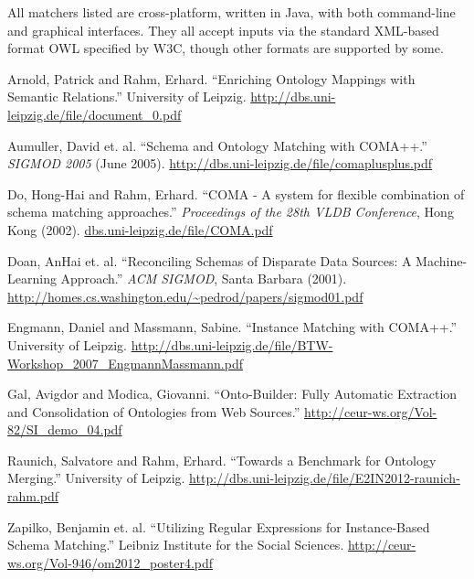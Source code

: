 \documentclass{article}
\theoremstyle{definition}
\theoremstyle{remark}
\begin{document}
All matchers listed are cross-platform, written in Java, with both command-line and graphical interfaces. They all accept inputs via the standard XML-based format OWL specified by W3C, though other formats are supported by some. 

\begin{thebibliography}{9}
	Arnold, Patrick and Rahm, Erhard.
	``Enriching Ontology Mappings with Semantic Relations.''
	University of Leipzig.
	\url{http://dbs.uni-leipzig.de/file/document_0.pdf}	

	Aumuller, David et. al.
	``Schema and Ontology Matching with COMA++.''
	\emph{SIGMOD 2005} (June 2005). 
	\url{http://dbs.uni-leipzig.de/file/comaplusplus.pdf}
	
	Do, Hong-Hai and Rahm, Erhard.
	``COMA - A system for flexible combination of schema matching approaches.''
	\emph{Proceedings of the 28th VLDB Conference}, Hong Kong (2002).
	\url{dbs.uni-leipzig.de/file/COMA.pdf}
	
	Doan, AnHai et. al.
	``Reconciling Schemas of Disparate Data Sources: A Machine-Learning Approach.''
	\emph{ACM SIGMOD}, Santa Barbara (2001).
	\url{http://homes.cs.washington.edu/~pedrod/papers/sigmod01.pdf}
	
	Engmann, Daniel and Massmann, Sabine.
	``Instance Matching with COMA++.''
	University of Leipzig.
	\url{ http://dbs.uni-leipzig.de/file/BTW-Workshop_2007_EngmannMassmann.pdf}
	
	Gal, Avigdor and Modica, Giovanni.
	``Onto-Builder: Fully Automatic Extraction and Consolidation of Ontologies from Web Sources.''
	\url{http://ceur-ws.org/Vol-82/SI_demo_04.pdf}

	Raunich, Salvatore and Rahm, Erhard.
	``Towards a Benchmark for Ontology Merging.''
	University of Leipzig.
	\url{http://dbs.uni-leipzig.de/file/E2IN2012-raunich-rahm.pdf}

	Zapilko, Benjamin et. al. 
	``Utilizing Regular Expressions for Instance-Based Schema Matching.''
	Leibniz Institute for the Social Sciences.
	\url{http://ceur-ws.org/Vol-946/om2012_poster4.pdf}
\end{thebibliography}
\end{document}
